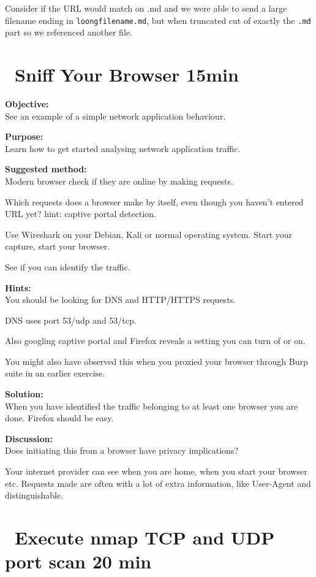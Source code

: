 \documentclass[a4paper,11pt,notitlepage]{report}
\begin{document}
Consider if the URL would match on .md and we were able to send a large filename ending in \verb+loongfilename.md+, but when truncated cut of exactly the \verb+.md+ part so we referenced another file.


\chapter{\faInfoCircle\ Sniff Your Browser 15min}
\label{ex:sniff-captive-portal}


{\bf Objective:}\\
See an example of a simple network application behaviour.

{\bf Purpose:}\\
Learn how to get started analysing network application traffic.

{\bf Suggested method:}\\
Modern browser check if they are online by making requests.

Which requests does a browser make by itself, even though you haven't entered URL yet? hint: captive portal detection.

Use Wireshark on your Debian, Kali or normal operating system. Start your capture, start your browser.

See if you can identify the traffic.

{\bf Hints:}\\
You should be looking for DNS and HTTP/HTTPS requests.

DNS uses port 53/udp and 53/tcp.

Also googling captive portal and Firefox reveals a setting you can turn of or on.

You might also have observed this when you proxied your browser through Burp suite in an earlier exercise.

{\bf Solution:}\\
When you have identified the traffic belonging to at least one browser you are done. Firefox should be easy.

{\bf Discussion:}\\
Does initiating this from a browser have privacy implications?

Your internet provider can see when you are home, when you start your browser etc. Requests made are often with a lot of extra information, like User-Agent and distinguishable.




\chapter{\faExclamationTriangle\ Execute nmap TCP and UDP port scan 20 min}
\label{ex:nmap-synscan}
\end{document}
